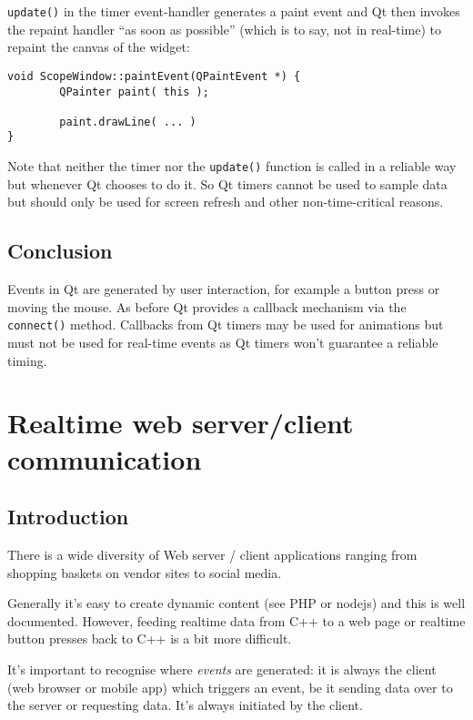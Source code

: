 \documentclass[12pt]{report}
\begin{document}
\texttt{update()} in the timer event-handler generates a
paint event and Qt then invokes the repaint
handler ``as soon as possible'' (which is to say, not in real-time) to repaint
the canvas of the widget:
\begin{verbatim}
void ScopeWindow::paintEvent(QPaintEvent *) {
        QPainter paint( this );

        paint.drawLine( ... )
}
\end{verbatim}

Note that neither the timer nor the \texttt{update()} function
is called in a reliable way but whenever Qt chooses to do it.
So Qt timers cannot be used to sample data but should
only be used for screen refresh and other non-time-critical
reasons.

\section{Conclusion}
Events in Qt are generated by user interaction, for example a button
press or moving the mouse. As before Qt provides a callback mechanism
via the \texttt{connect()} method. Callbacks from Qt timers may be used for
animations but must not be used for real-time events as Qt timers won't
guarantee a reliable timing.




\chapter{Realtime web server/client communication\label{webserver}}

\section{Introduction}

There is a wide diversity of Web server / client applications
ranging from shopping baskets on vendor sites to social
media.

Generally it's easy to create dynamic content (see PHP or nodejs) and this is well
documented. However, feeding realtime data from C++ to a web page or
realtime button presses back to C++ is a bit more difficult.

It's important to recognise where \textsl{events} are generated: it is
always the client (web browser or mobile app) which triggers an event,
be it sending data over to the server or requesting data. It's
always initiated by the client.
\end{document}
